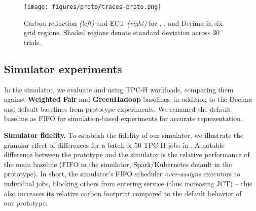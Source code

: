 \begin{figure}[t]
    \centering 
    \texttt{[image: figures/proto/traces-proto.png]}  
    \vspace{-0.4cm}
    \caption{ Carbon reduction \textit{(left)} and ECT \textit{(right)} for \DANISH, \CAP, and Decima in six grid regions. Shaded regions denote standard deviation across 30 trials. }
    \label{fig:traces-proto} 
    \vspace{-0.5cm}
\end{figure} 


\vspace{-0.5em}

\subsection{Simulator experiments}
\label{sec:eval-sim}

In the simulator, we evaluate \DANISH and \CAP using TPC-H workloads, comparing them against \textbf{Weighted Fair} and \textbf{GreenHadoop} baselines, in addition to the Decima and default baselines from prototype experiments. 
We renamed the default baseline as FIFO for simulation-based experiments for accurate representation.



\noindent\textbf{Simulator fidelity.} To establish the fidelity of our simulator, we illustrate the granular effect of differences for a batch of 50 TPC-H jobs in .  
A notable difference between the prototype and the simulator is the relative performance of the main baseline (FIFO in the simulator, Spark/Kubernetes default in the prototype).  
In short, the simulator's FIFO scheduler \textit{over-assigns} executors to individual jobs, blocking others from entering service (thus increasing JCT) -- this also increases its relative carbon footprint compared to the default behavior of our prototype.






